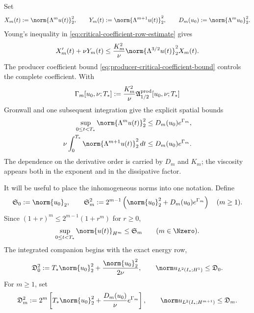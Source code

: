 Set
\[
 X_m(t):=\norm{\Lambda^m u(t)}_2^2,
 \qquad
 Y_m(t):=\norm{\Lambda^{m+1}u(t)}_2^2,
 \qquad
 D_m(u_0):=\norm{\Lambda^m u_0}_2^2.
\]
Young's inequality in \eqref{eq:critical-coefficient-row-estimate} gives
\begin{equation*}
 X_m'(t)+\nu Y_m(t)
 \le\frac{K_m^2}{\nu}
 \norm{\Lambda^{3/2}u(t)}_2^2X_m(t).
\end{equation*}
The producer coefficient bound \eqref{eq:producer-critical-coefficient-bound}
controls the complete coefficient.
With
\begin{equation}
 \Gamma_m[u_0,\nu;T_*]
 :=\frac{K_m^2}{\nu}
 \mathfrak A_{1/2}^{\rm prod}[u_0,\nu;T_*]
 \label{eq:spatial-envelope-exponent}
\end{equation}
Gronwall and one subsequent integration give the explicit spatial bounds
\begin{equation}
 \begin{aligned}
  \sup_{0\le t<T_*}\norm{\Lambda^m u(t)}_2^2
  &\le D_m(u_0)e^{\Gamma_m},\\
  \nu\int_0^{T_*}\norm{\Lambda^{m+1}u(t)}_2^2\,dt
  &\le D_m(u_0)e^{\Gamma_m}.
 \end{aligned}
 \label{eq:explicit-spatial-envelope}
\end{equation}
The dependence on the derivative order is carried by \(D_m\) and \(K_m\);
the viscosity appears both in the exponent and in the dissipative factor.

It will be useful to place the inhomogeneous norms into one notation.  Define
\begin{equation}
 \mathfrak S_0:=\norm{u_0}_2,
 \qquad
 \mathfrak S_m^2
 :=2^{m-1}\left(
  \norm{u_0}_2^2+D_m(u_0)e^{\Gamma_m}
 \right)
 \quad(m\ge1).
 \label{eq:spatial-sup-envelope}
\end{equation}
Since \((1+r)^m\le2^{m-1}(1+r^m)\) for \(r\ge0\),
\begin{equation}
 \sup_{0\le t<T_*}\norm{u(t)}_{H^m}\le\mathfrak S_m
 \qquad(m\in\Nzero).
 \label{eq:spatial-sup-envelope-bound}
\end{equation}
The integrated companion begins with the exact energy row,
\begin{equation}
 \mathfrak D_0^2
 :=T_*\norm{u_0}_2^2+\frac{\norm{u_0}_2^2}{2\nu},
 \qquad
 \norm u_{L^2(I_*;H^1)}\le\mathfrak D_0.
 \label{eq:spatial-dissipation-envelope-zero}
\end{equation}
For \(m\ge1\), set
\begin{equation}
 \mathfrak D_m^2
 :=2^m\left[
  T_*\norm{u_0}_2^2
  +\frac{D_m(u_0)}{\nu}e^{\Gamma_m}
 \right],
 \qquad
 \norm u_{L^2(I_*;H^{m+1})}\le\mathfrak D_m.
 \label{eq:spatial-dissipation-envelope}
\end{equation}

